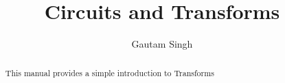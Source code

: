 \documentclass[journal,12pt,twocolumn]{IEEEtran}
\renewcommand\thesection{\arabic{section}}
\begin{document}
\let\StandardTheFigure\thefigure
\renewcommand{\thefigure}{\theproblem}
\renewcommand{\thefigure}{\arabic{section}.\arabic{figure}}
\makeatletter
{}
\makeatother


\def\putbox#1#2#3{\makebox[0in][l]{\makebox[#1][l]{}\raisebox{\baselineskip}[0in][0in]{\raisebox{#2}[0in][0in]{#3}}}}
     \def\rightbox#1{\makebox[0in][r]{#1}}
     \def\centbox#1{\makebox[0in]{#1}}
     \def\topbox#1{\raisebox{-\baselineskip}[0in][0in]{#1}}
     \def\midbox#1{\raisebox{-0.5\baselineskip}[0in][0in]{#1}}

\vspace{3cm}

\title{ 
Circuits and Transforms
}

\author{Gautam Singh}

\maketitle


\tableofcontents


\renewcommand{\thefigure}{\theenumi}
\renewcommand{\thetable}{\theenumi}



\bigskip

\begin{abstract}
This manual provides a simple introduction to Transforms
\end{abstract}
\end{document}
